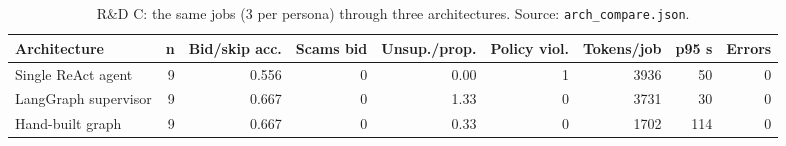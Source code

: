 \begin{table}[t]\centering\small\caption{R\&D C: the same jobs (3 per persona) through three architectures. Source: \texttt{arch\_compare.json}.}\label{tab:arch}
\begin{tabular}{lrrrrrrrr}\toprule Architecture & n & Bid/skip acc. & Scams bid & Unsup./prop. & Policy viol. & Tokens/job & p95 s & Errors\\\midrule
Single ReAct agent & 9 & 0.556 & 0 & 0.00 & 1 & 3936 & 50 & 0 \\
LangGraph supervisor & 9 & 0.667 & 0 & 1.33 & 0 & 3731 & 30 & 0 \\
Hand-built graph & 9 & 0.667 & 0 & 0.33 & 0 & 1702 & 114 & 0 \\
\bottomrule\end{tabular}\end{table}